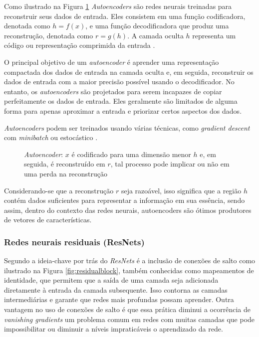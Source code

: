 			\par Como ilustrado na Figura \ref{fig:autoencoder} \textit{Autoencoders} são redes neurais treinadas para reconstruir seus dados de entrada. Eles consistem em uma função codificadora, denotada como $h = f(x)$, e uma função decodificadora que produz uma reconstrução, denotada como $r = g(h)$. A camada oculta $h$ representa um código ou representação comprimida da entrada \cite{Goodfellow-et-al-2016}. \newline
			
			\par O principal objetivo de um \textit{autoencoder} é aprender uma representação compactada dos dados de entrada na camada oculta e, em seguida, reconstruir os dados de entrada com a maior precisão possível usando o decodificador. No entanto, os \textit{autoencoders} são projetados para serem incapazes de copiar perfeitamente os dados de entrada. Eles geralmente são limitados de alguma forma para apenas aproximar a entrada e priorizar certos aspectos dos dados. \newline
			
			\par \textit{Autoencoders} podem ser treinados usando várias técnicas, como \textit{gradient descent} com \textit{minibatch} ou estocástico \cite{Goodfellow-et-al-2016}.
	
			\begin{figure}[h]
				\centering
				\caption[autoencoder]{\textit{Autoencoder}: $x$ é codificado para uma dimensão menor $h$ e, em seguida, é reconstruído em $r$, tal processo pode implicar ou não em uma perda na reconstrução}
				
				\label{fig:autoencoder}
			\end{figure}
			
			\par Considerando-se que a reconstrução $r$ seja razoável, isso significa que a região $h$  contém dados suficientes para representar a informação em sua essência, sendo assim, dentro do contexto das redes neurais, autoencoders são ótimos produtores de vetores de características.
	
		\subsubsection{Redes neurais residuais (ResNets)}
			\par Segundo \cite{DBLP:journals/corr/HeZRS15} a ideia-chave por trás do \textit{ResNets} é a inclusão de conexões de salto como ilustrado na Figura \ref{fig:residualblock}, também conhecidas como mapeamentos de identidade, que permitem que a saída de uma camada seja adicionada diretamente à entrada da camada subsequente. Isso contorna as camadas intermediárias e garante que redes mais profundas possam aprender. Outra vantagem no uso de conexões de salto é que essa prática diminui a ocorrência de \textit{vanishing gradients} um problema comum em redes com muitas camadas que pode impossibilitar ou diminuir a níveis impraticáveis o aprendizado da rede.
			
